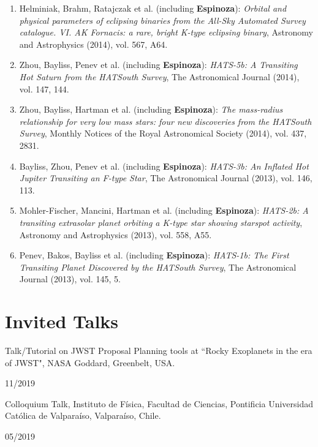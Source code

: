 \documentclass[12pt, a4paper]{article} %
\begin{document}
\begin{flushleft}
\begin{enumerate}
\item Helminiak, Brahm, Ratajczak et al. (including \textbf{Espinoza}): \textit{Orbital and physical parameters of eclipsing binaries from the All-Sky Automated Survey catalogue. VI. AK Fornacis: a rare, bright K-type eclipsing binary}, Astronomy and Astrophysics (2014), vol. 567, A64.
\item Zhou, Bayliss, Penev et al. (including \textbf{Espinoza}): \textit{HATS-5b: A Transiting Hot Saturn from the HATSouth Survey}, The Astronomical Journal (2014), vol. 147, 144.
\item Zhou, Bayliss, Hartman et al. (including \textbf{Espinoza}): \textit{The mass-radius relationship for very low mass stars: four new discoveries from the HATSouth Survey}, Monthly Notices of the Royal Astronomical Society (2014), vol. 437, 2831.
\item Bayliss, Zhou, Penev et al. (including \textbf{Espinoza}): \textit{HATS-3b: An Inflated Hot Jupiter Transiting an F-type Star}, The Astronomical Journal (2013), vol. 146, 113.
\item Mohler-Fischer, Mancini, Hartman et al. (including \textbf{Espinoza}): \textit{HATS-2b: A transiting extrasolar planet orbiting a K-type star showing starspot activity}, Astronomy and Astrophysics (2013), vol. 558, A55.
\item Penev, Bakos, Bayliss et al. (including \textbf{Espinoza}): \textit{HATS-1b: The First Transiting Planet Discovered by the HATSouth Survey}, The Astronomical Journal (2013), vol. 145, 5.
\end{enumerate}
\end{flushleft}



\section*{Invited Talks}
\begin{minipage}[t]{0.7\textwidth}
\begin{flushleft}%
  \setlength{\leftskip}{0.2cm}%
Talk/Tutorial on JWST Proposal Planning tools at ``Rocky Exoplanets in the era of JWST", NASA Goddard, Greenbelt, USA.
\end{flushleft}
\end{minipage}
\begin{minipage}[t]{0.3\textwidth}
\hfill 11/2019
\end{minipage}

\begin{minipage}[t]{0.7\textwidth}
\begin{flushleft}%
  \setlength{\leftskip}{0.2cm}%
Colloquium Talk, Instituto de F\'isica, Facultad de Ciencias, Pontificia Universidad Cat\'olica de Valpara\'iso, Valpara\'iso, Chile.
\end{flushleft}
\end{minipage}
\begin{minipage}[t]{0.3\textwidth}
\hfill 05/2019
\end{minipage}
\end{document}
